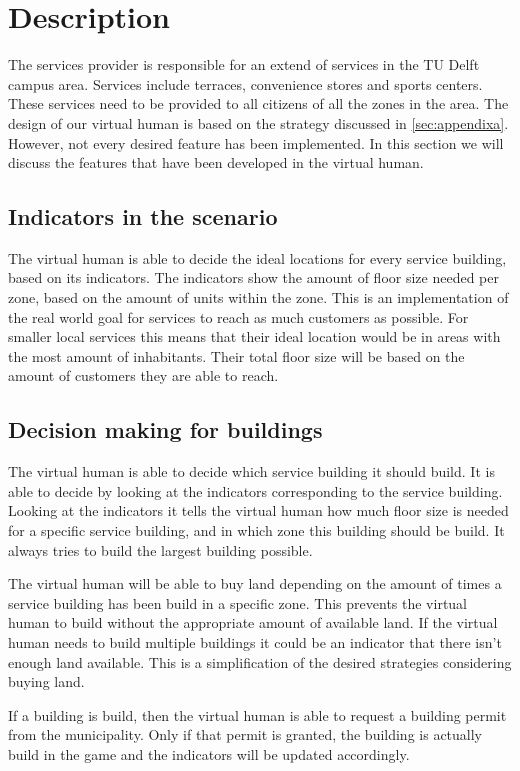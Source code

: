 \section{Description}
The services provider is responsible for an extend of services in the TU Delft campus area. Services include terraces, convenience stores and sports centers. These services need to be provided to all citizens of all the zones in the area. The design of our virtual human is based on the strategy discussed in \ref{sec:appendixa}. However, not every desired feature has been implemented. In this section we will discuss the features that have been developed in the virtual human.

\subsection{Indicators in the scenario}
The virtual human is able to decide the ideal locations for every service building, based on its indicators. The indicators show the amount of floor size needed per zone, based on the amount of units within the zone. This is an implementation of the real world goal for services to reach as much customers as possible. For smaller local services this means that their ideal location would be in areas with the most amount of inhabitants. Their total floor size will be based on the amount of customers they are able to reach. 

\subsection{Decision making for buildings}
The virtual human is able to decide which service building it should build. It is able to decide by looking at the indicators corresponding to the service building. Looking at the indicators it tells the virtual human how much floor size is needed for a specific service building, and in which zone this building should be build. It always tries to build the largest building possible.

The virtual human will be able to buy land depending on the amount of times a service building has been build in a specific zone. This prevents the virtual human to build without the appropriate amount of available land. If the virtual human needs to build multiple buildings it could be an indicator that there isn't enough land available. This is a simplification of the desired strategies considering buying land.

If a building is build, then the virtual human is able to request a building permit from the municipality. Only if that permit is granted, the building is actually build in the game and the indicators will be updated accordingly.

